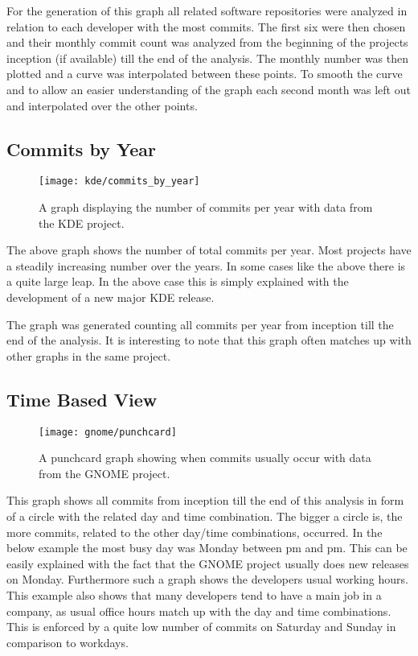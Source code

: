 For the generation of this graph all related software repositories were
analyzed in relation to each developer with the most commits. The first six
were then chosen and their monthly commit count was analyzed from the beginning
of the projects inception (if available) till the end of the analysis. The
monthly number was then plotted and a curve was interpolated between these
points. To smooth the curve and to allow an easier understanding of the graph
each second month was left out and interpolated over the other points.


\subsection{Commits by Year} %

\begin{figure}[h!t]
  \centering
  \texttt{[image: kde/commits\_by\_year]}
  \caption[The Commits by Year Graph]
  {A graph displaying the number of commits per year with data from the KDE
    project.}
\end{figure}

The above graph shows the number of total commits per year. Most projects have
a steadily increasing number over the years. In some cases like the above there
is a quite large leap. In the above case this is simply explained with the
development of a new major KDE release.

The graph was generated counting all commits per year from inception till the
end of the analysis. It is interesting to note that this graph often matches up
with other graphs in the same project.


\subsection{Time Based View} %

\begin{figure}[h!t]
  \centering
  \texttt{[image: gnome/punchcard]}
  \caption[The Time Based View Graph]
  {A punchcard graph showing when commits usually occur with data from the
    GNOME project.}
\end{figure}

This graph shows all commits from inception till the end of this analysis in
form of a circle with the related day and time combination. The bigger a circle
is, the more commits, related to the other day/time combinations, occurred. In
the below example the most busy day was Monday between \unit[4]{pm} and
\unit[12]{pm}. This can be easily explained with the fact that the GNOME
project usually does new releases on Monday. Furthermore such a graph shows the
developers usual working hours. This example also shows that many developers
tend to have a main job in a company, as usual office hours match up with the
day and time combinations. This is enforced by a quite low number of commits on
Saturday and Sunday in comparison to workdays.

